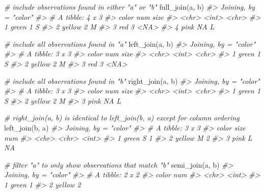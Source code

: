 \documentclass[
]{book}
\newenvironment{Shaded}{\begin{snugshade}}{\end{snugshade}}
\newcommand{\CommentTok}[1]{\textcolor[rgb]{0.56,0.35,0.01}{\textit{#1}}}
\newcommand{\FunctionTok}[1]{\textcolor[rgb]{0.00,0.00,0.00}{#1}}
\newcommand{\NormalTok}[1]{#1}
\begin{document}
\begin{Shaded}
\begin{Highlighting}[]
\CommentTok{\# include observations found in either "a" or "b"}
\FunctionTok{full\_join}\NormalTok{(a, b)}
\CommentTok{\#\textgreater{} Joining, by = "color"}
\CommentTok{\#\textgreater{} \# A tibble: 4 x 3}
\CommentTok{\#\textgreater{}   color    num size }
\CommentTok{\#\textgreater{}   \textless{}chr\textgreater{}  \textless{}int\textgreater{} \textless{}chr\textgreater{}}
\CommentTok{\#\textgreater{} 1 green      1 S    }
\CommentTok{\#\textgreater{} 2 yellow     2 M    }
\CommentTok{\#\textgreater{} 3 red        3 \textless{}NA\textgreater{} }
\CommentTok{\#\textgreater{} 4 pink      NA L}

\CommentTok{\# include all observations found in "a"}
\FunctionTok{left\_join}\NormalTok{(a, b)}
\CommentTok{\#\textgreater{} Joining, by = "color"}
\CommentTok{\#\textgreater{} \# A tibble: 3 x 3}
\CommentTok{\#\textgreater{}   color    num size }
\CommentTok{\#\textgreater{}   \textless{}chr\textgreater{}  \textless{}int\textgreater{} \textless{}chr\textgreater{}}
\CommentTok{\#\textgreater{} 1 green      1 S    }
\CommentTok{\#\textgreater{} 2 yellow     2 M    }
\CommentTok{\#\textgreater{} 3 red        3 \textless{}NA\textgreater{}}

\CommentTok{\# include all observations found in "b"}
\FunctionTok{right\_join}\NormalTok{(a, b)}
\CommentTok{\#\textgreater{} Joining, by = "color"}
\CommentTok{\#\textgreater{} \# A tibble: 3 x 3}
\CommentTok{\#\textgreater{}   color    num size }
\CommentTok{\#\textgreater{}   \textless{}chr\textgreater{}  \textless{}int\textgreater{} \textless{}chr\textgreater{}}
\CommentTok{\#\textgreater{} 1 green      1 S    }
\CommentTok{\#\textgreater{} 2 yellow     2 M    }
\CommentTok{\#\textgreater{} 3 pink      NA L}

\CommentTok{\# right\_join(a, b) is identical to left\_join(b, a) except for column ordering}
\FunctionTok{left\_join}\NormalTok{(b, a)}
\CommentTok{\#\textgreater{} Joining, by = "color"}
\CommentTok{\#\textgreater{} \# A tibble: 3 x 3}
\CommentTok{\#\textgreater{}   color  size    num}
\CommentTok{\#\textgreater{}   \textless{}chr\textgreater{}  \textless{}chr\textgreater{} \textless{}int\textgreater{}}
\CommentTok{\#\textgreater{} 1 green  S         1}
\CommentTok{\#\textgreater{} 2 yellow M         2}
\CommentTok{\#\textgreater{} 3 pink   L        NA}

\CommentTok{\# filter "a" to only show observations that match "b"}
\FunctionTok{semi\_join}\NormalTok{(a, b)}
\CommentTok{\#\textgreater{} Joining, by = "color"}
\CommentTok{\#\textgreater{} \# A tibble: 2 x 2}
\CommentTok{\#\textgreater{}   color    num}
\CommentTok{\#\textgreater{}   \textless{}chr\textgreater{}  \textless{}int\textgreater{}}
\CommentTok{\#\textgreater{} 1 green      1}
\CommentTok{\#\textgreater{} 2 yellow     2}


\end{Highlighting}
\end{Shaded}
\end{document}
